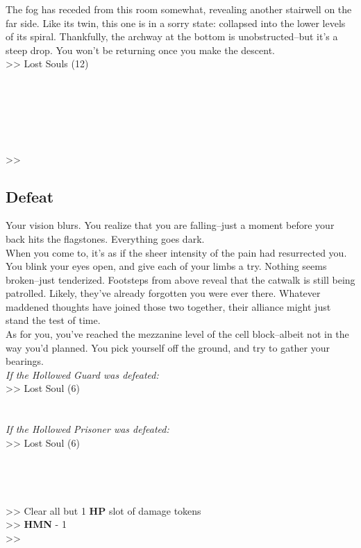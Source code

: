 The fog has receded from this room somewhat, revealing another stairwell on the far side. Like its twin, this one is in a sorry state: collapsed into the lower levels of its spiral. Thankfully, the archway at the bottom is unobstructed--but it’s a steep drop. You won’t be returning once you make the descent.\\

>> Lost Souls (12)\\
\\
\\
\\
\\
\\
\\
>> 

\subsection*{Defeat}
Your vision blurs. You realize that you are falling--just a moment before your back hits the flagstones. Everything goes dark.\\

When you come to, it’s as if the sheer intensity of the pain had resurrected you. You blink your eyes open, and give each of your limbs a try. Nothing seems broken--just tenderized. Footsteps from above reveal that the catwalk is still being patrolled. Likely, they’ve already forgotten you were ever there. Whatever maddened thoughts have joined those two together, their alliance might just stand the test of time.\\

As for you, you’ve reached the mezzanine level of the cell block--albeit not in the way you’d planned. You pick yourself off the ground, and try to gather your bearings.\\

\emph{If the Hollowed Guard was defeated:}\\
>> Lost Soul (6)\\
\\
\\

\emph{If the Hollowed Prisoner was defeated:}\\
>> Lost Soul (6)\\
\\
\\
\\
\\

>> Clear all but 1 \textbf{HP} slot of damage tokens\\
>> \textbf{HMN} - 1\\
>> 